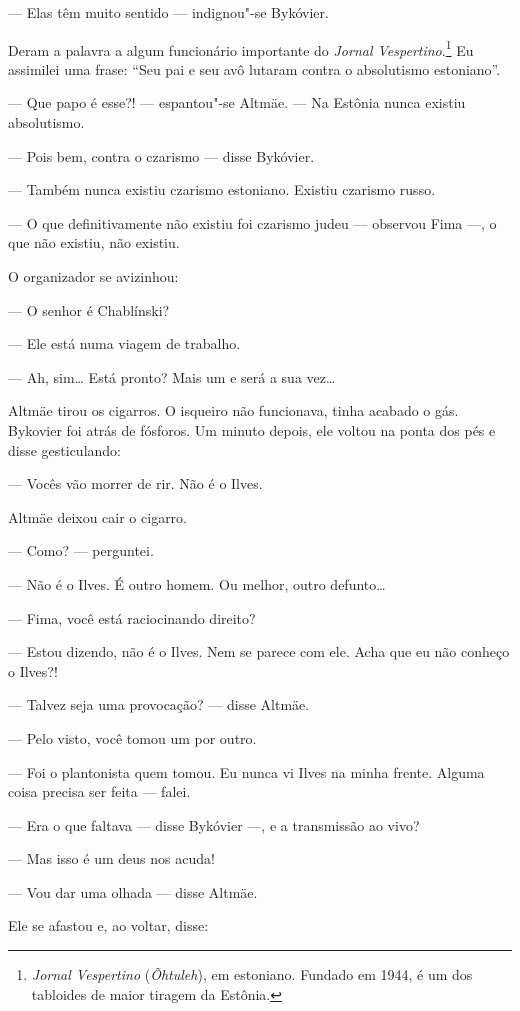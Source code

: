 --- Elas têm muito sentido --- indignou"-se Bykóvier.

Deram a palavra a algum funcionário importante do \emph{Jornal
Vespertino}.\footnote{\emph{Jornal Vespertino} (\emph{Õhtuleh}),
  em estoniano. Fundado em 1944, é um dos tabloides de maior tiragem da
  Estônia.} Eu assimilei uma frase: ``Seu pai e seu avô lutaram contra o
absolutismo estoniano''.

--- Que papo é esse?! --- espantou"-se Altmäe. --- Na Estônia nunca
existiu absolutismo.

--- Pois bem, contra o czarismo --- disse Bykóvier.

--- Também nunca existiu czarismo estoniano. Existiu czarismo russo.

--- O que definitivamente não existiu foi czarismo judeu --- observou
Fima ---, o que não existiu, não existiu.

O organizador se avizinhou:

--- O senhor é Chablínski?

--- Ele está numa viagem de trabalho.

--- Ah, sim\ldots{} Está pronto? Mais um e será a sua vez\ldots{}

Altmäe tirou os cigarros. O isqueiro não funcionava, tinha acabado o
gás. Bykovier foi atrás de fósforos. Um minuto depois, ele voltou na
ponta dos pés e disse gesticulando:

--- Vocês vão morrer de rir. Não é o Ilves.

Altmäe deixou cair o cigarro.

--- Como? --- perguntei.

--- Não é o Ilves. É outro homem. Ou melhor, outro defunto\ldots{}

--- Fima, você está raciocinando direito?

--- Estou dizendo, não é o Ilves. Nem se parece com ele. Acha que eu não
conheço o Ilves?!

--- Talvez seja uma provocação? --- disse Altmäe.

--- Pelo visto, você tomou um por outro.

--- Foi o plantonista quem tomou. Eu nunca vi Ilves na minha frente.
Alguma coisa precisa ser feita --- falei.

--- Era o que faltava --- disse Bykóvier ---, e a transmissão ao vivo?

--- Mas isso é um deus nos acuda!

--- Vou dar uma olhada --- disse Altmäe.

Ele se afastou e, ao voltar, disse:

